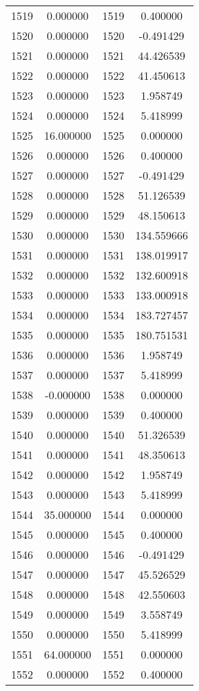 \documentclass[12pt]{article}
\begin{document}
\begin{longtable}{@{}cccc@{}}
1519 & 0.000000 & 1519 & 0.400000 \\
1520 & 0.000000 & 1520 & -0.491429 \\
1521 & 0.000000 & 1521 & 44.426539 \\
1522 & 0.000000 & 1522 & 41.450613 \\
1523 & 0.000000 & 1523 & 1.958749 \\
1524 & 0.000000 & 1524 & 5.418999 \\
1525 & 16.000000 & 1525 & 0.000000 \\
1526 & 0.000000 & 1526 & 0.400000 \\
1527 & 0.000000 & 1527 & -0.491429 \\
1528 & 0.000000 & 1528 & 51.126539 \\
1529 & 0.000000 & 1529 & 48.150613 \\
1530 & 0.000000 & 1530 & 134.559666 \\
1531 & 0.000000 & 1531 & 138.019917 \\
1532 & 0.000000 & 1532 & 132.600918 \\
1533 & 0.000000 & 1533 & 133.000918 \\
1534 & 0.000000 & 1534 & 183.727457 \\
1535 & 0.000000 & 1535 & 180.751531 \\
1536 & 0.000000 & 1536 & 1.958749 \\
1537 & 0.000000 & 1537 & 5.418999 \\
1538 & -0.000000 & 1538 & 0.000000 \\
1539 & 0.000000 & 1539 & 0.400000 \\
1540 & 0.000000 & 1540 & 51.326539 \\
1541 & 0.000000 & 1541 & 48.350613 \\
1542 & 0.000000 & 1542 & 1.958749 \\
1543 & 0.000000 & 1543 & 5.418999 \\
1544 & 35.000000 & 1544 & 0.000000 \\
1545 & 0.000000 & 1545 & 0.400000 \\
1546 & 0.000000 & 1546 & -0.491429 \\
1547 & 0.000000 & 1547 & 45.526529 \\
1548 & 0.000000 & 1548 & 42.550603 \\
1549 & 0.000000 & 1549 & 3.558749 \\
1550 & 0.000000 & 1550 & 5.418999 \\
1551 & 64.000000 & 1551 & 0.000000 \\
1552 & 0.000000 & 1552 & 0.400000 \\

\end{longtable}
\end{document}
